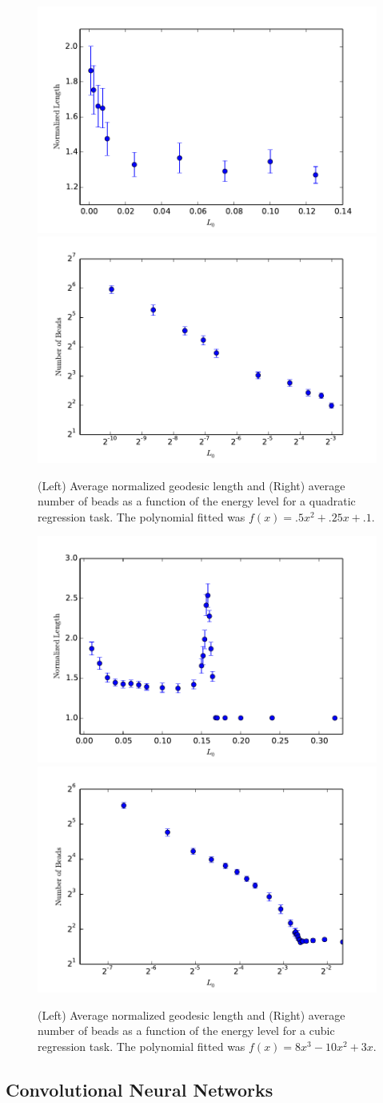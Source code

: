 \begin{figure}
\label{QUADRATICSfigs}
\centering
\includegraphics[width=.4\textwidth]{../Plots/normlengthquadratics}
\includegraphics[width=.4\textwidth]{../Plots/numbeadsquadratics}
\caption{(Left) Average normalized geodesic length and (Right) average number of beads as a function of the energy level for a quadratic regression task.  The polynomial fitted was $f(x) = .5x^2 + .25x + .1$.}
\end{figure}
 
 
 \begin{figure}
\label{CUBICSfigs}
\centering
\includegraphics[width=.4\textwidth]{../Plots/normlengthcubics}
\includegraphics[width=.4\textwidth]{../Plots/numbeadscubics}
\caption{(Left) Average normalized geodesic length and (Right) average number of beads as a function of the energy level for a cubic regression task.  The polynomial fitted was $f(x) = 8x^3 -10x^2 + 3x$.}
\end{figure}

\subsection{Convolutional Neural Networks}
\label{sec:CNN}

